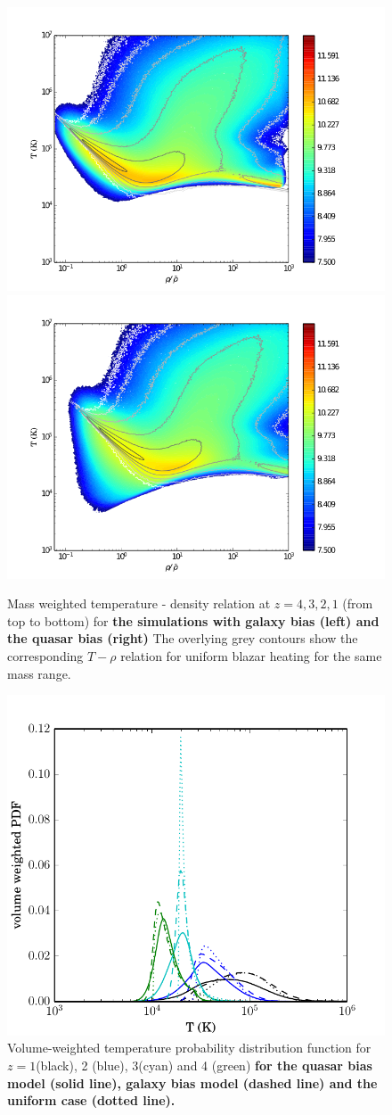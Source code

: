 \documentclass[twocolumns]{emulateapj}
\newcommand\ALc[1]{{\color{red} \bf #1}} %
\begin{document}
{\begin{figure}
  \includegraphics[width = .42\textwidth ]{T_rho_z1_gal2_ok.png}
  \includegraphics[width = .42\textwidth ]{T_rho_z1_qso4_ok.png}

  \caption{Mass weighted temperature - density relation at $z=4,3,2,1$ (from top to bottom) for \ALc{the simulations with galaxy bias (left) and the quasar bias (right)} The overlying grey contours show the corresponding $T-\rho$ relation for uniform blazar heating \citep{2012MNRAS.423..149P} for the same mass range. }
  \label{fig:T_rho}
\end{figure}


\begin{figure}[h]
  \centering
  \includegraphics[width = .45\textwidth ]{full_PDF_256_gal_qso.pdf}
  \caption{Volume-weighted  temperature probability distribution function for $z=1$(black), 2 (blue), 3(cyan) and 4 (green) \ALc{for the quasar bias model (solid line), galaxy bias model (dashed line) and the uniform case (dotted line).} }
  \label{fig:PDF}
\end{figure}


}
\end{document}
